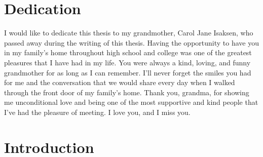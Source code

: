 \documentclass[12pt,twoside]{reedthesis}
\theoremstyle{definition}
\begin{document}
	\chapter*{Dedication}
	I would like to dedicate this thesis to my grandmother, Carol Jane Isaksen, who passed away during the writing of this thesis. Having the opportunity to have you in my family's home throughout high school and college was one of the greatest pleasures that I have had in my life. You were always a kind, loving, and funny grandmother for as long as I can remember. I'll never forget the smiles you had for me and the conversation that we would share every day when I walked through the front door of my family's home. Thank you, grandma, for showing me unconditional love and being one of the most supportive and kind people that I've had the pleasure of meeting. I love you, and I miss you.

  \mainmatter %
  \pagestyle{fancyplain} %


    \chapter*{Introduction}
\end{document}
